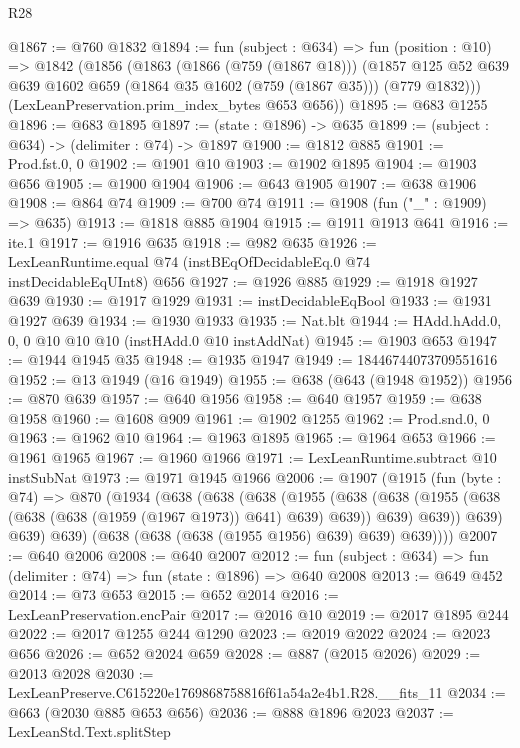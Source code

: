 \begin{lexlean}{R28}
\begin{coremodule}
@1867 := @760 @1832
@1894 := fun (subject : @634) =>
  fun (position : @10) =>
  @1842
    (@1856
      (@1863
        (@1866 (@759 (@1867 @18)))
        (@1857 @125 @52 @639 @639 @1602 @659 (@1864 @35 @1602 (@759 (@1867 @35))) (@779 @1832)))
      (LexLeanPreservation.prim_index_bytes @653 @656))
@1895 := @683 @1255
@1896 := @683 @1895
@1897 := (state : @1896) -> @635
@1899 := (subject : @634) -> (delimiter : @74) -> @1897
@1900 := @1812 @885
@1901 := Prod.fst.{0, 0}
@1902 := @1901 @10
@1903 := @1902 @1895
@1904 := @1903 @656
@1905 := @1900 @1904
@1906 := @643 @1905
@1907 := @638 @1906
@1908 := @864 @74
@1909 := @700 @74
@1911 := @1908 (fun ("_" : @1909) => @635)
@1913 := @1818 @885 @1904
@1915 := @1911 @1913 @641
@1916 := ite.{1}
@1917 := @1916 @635
@1918 := @982 @635
@1926 := LexLeanRuntime.equal @74 (instBEqOfDecidableEq.{0} @74 instDecidableEqUInt8) @656
@1927 := @1926 @885
@1929 := @1918 @1927 @639
@1930 := @1917 @1929
@1931 := instDecidableEqBool
@1933 := @1931 @1927 @639
@1934 := @1930 @1933
@1935 := Nat.blt
@1944 := HAdd.hAdd.{0, 0, 0} @10 @10 @10 (instHAdd.{0} @10 instAddNat)
@1945 := @1903 @653
@1947 := @1944 @1945 @35
@1948 := @1935 @1947
@1949 := 18446744073709551616
@1952 := @13 @1949 (@16 @1949)
@1955 := @638 (@643 (@1948 @1952))
@1956 := @870 @639
@1957 := @640 @1956
@1958 := @640 @1957
@1959 := @638 @1958
@1960 := @1608 @909
@1961 := @1902 @1255
@1962 := Prod.snd.{0, 0}
@1963 := @1962 @10
@1964 := @1963 @1895
@1965 := @1964 @653
@1966 := @1961 @1965
@1967 := @1960 @1966
@1971 := LexLeanRuntime.subtract @10 instSubNat
@1973 := @1971 @1945 @1966
@2006 := @1907
    (@1915
      (fun (byte : @74) =>
      @870
        (@1934
          (@638
            (@638
              (@638
                (@1955
                  (@638
                    (@638 (@1955 (@638 (@638 (@638 (@1959 (@1967 @1973)) @641) @639) @639)) @639)
                    @639))
                @639)
              @639)
            @639)
          (@638 (@638 (@638 (@1955 @1956) @639) @639) @639))))
@2007 := @640 @2006
@2008 := @640 @2007
@2012 := fun (subject : @634) => fun (delimiter : @74) => fun (state : @1896) => @640 @2008
@2013 := @649 @452
@2014 := @73 @653
@2015 := @652 @2014
@2016 := LexLeanPreservation.encPair
@2017 := @2016 @10
@2019 := @2017 @1895 @244
@2022 := @2017 @1255 @244 @1290
@2023 := @2019 @2022
@2024 := @2023 @656
@2026 := @652 @2024 @659
@2028 := @887 (@2015 @2026)
@2029 := @2013 @2028
@2030 := LexLeanPreserve.C615220e1769868758816f61a54a2e4b1.R28.__fits_11
@2034 := @663 (@2030 @885 @653 @656)
@2036 := @888 @1896 @2023
@2037 := LexLeanStd.Text.splitStep

\end{coremodule}
\end{lexlean}
